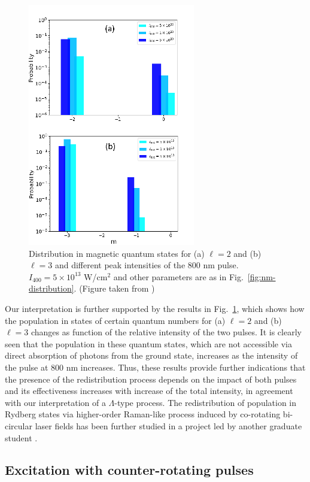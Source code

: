 \begin{figure}[!ht]
\centering
\includegraphics[width=0.5\columnwidth]{figs/Rydberg/Gebre-bicircular-Fig5.png}
\caption{\label{fig:nm-fixedl-distribution}
{
Distribution in magnetic quantum states for (a) $\ell = 2$ and (b) $\ell = 3 $ and different peak intensities of the 800 nm pulse. $I_{400} = 5\times 10^{13}$ W/cm$^2$ and other parameters are as in Fig.~\ref{fig:nm-distribution}. (Figure taken from \cite{venzke2020_ryd})}
}
\end{figure}

Our interpretation is further supported by the results in Fig.~\ref{fig:nm-fixedl-distribution}, which shows how the population in states of certain quantum numbers for (a) $\ell = 2$ and (b) $\ell = 3$ changes as function of the relative intensity of the two pulses. It is clearly seen that the population in these quantum states, which are not accessible via direct absorption of photons from the ground state, increases as the intensity of the pulse at 800 nm increases. Thus, these results provide further indications that the presence of the redistribution process depends on the impact of both pulses and its effectiveness increases with increase of the total intensity, in agreement with our interpretation of a $\Lambda$-type process. The redistribution of population in Rydberg states via higher-order Raman-like process induced by co-rotating bi-circular laser fields has been further studied in a project led by another graduate student \cite{gebre2021}.

\subsection{Excitation with counter-rotating pulses}

